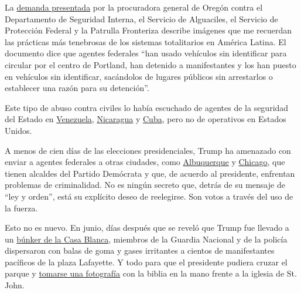 La
\href{http://opb-imgserve-production.s3-website-us-west-2.amazonaws.com/original/ag_rosenblum_xxxx_updated_complaint_1595086491349.pdf}{demanda
presentada} por la procuradora general de Oregón contra el Departamento
de Seguridad Interna, el Servicio de Alguaciles, el Servicio de
Protección Federal y la Patrulla Fronteriza describe imágenes que me
recuerdan las prácticas más tenebrosas de los sistemas totalitarios en
América Latina. El documento dice que agentes federales ``han usado
vehículos sin identificar para circular por el centro de Portland, han
detenido a manifestantes y los han puesto en vehículos sin identificar,
sacándolos de lugares públicos sin arrestarlos o establecer una razón
para su detención''.

Este tipo de abuso contra civiles lo había escuchado de agentes de la
seguridad del Estado en
\href{https://www.nytimes3xbfgragh.onion/es/2020/07/26/espanol/opinion/nicmer-evans-venezuela.html}{Venezuela},
\href{https://www.nytimes3xbfgragh.onion/es/2019/02/18/espanol/opinion/nicaragua-prensa-chamorro.html}{Nicaragua}
y
\href{https://www.nytimes3xbfgragh.onion/es/2019/05/31/espanol/opinion/cuba-jovenes-revolucion.html}{Cuba},
pero no de operativos en Estados Unidos.

A menos de cien días de las elecciones presidenciales, Trump ha
amenazado con enviar a agentes federales a otras ciudades, como
\href{https://www.santafenewmexican.com/news/local_news/trump-announces-deployment-of-federal-agents-to-albuquerque/article_e80a12d6-cc34-11ea-9ab0-5b1cd8827f75.html}{Albuquerque}
y
\href{https://www.nytimes3xbfgragh.onion/2020/07/23/us/politics/trump-chicago-federal-agents.html}{Chicago},
que tienen alcaldes del Partido Demócrata y que, de acuerdo al
presidente, enfrentan problemas de criminalidad. No es ningún secreto
que, detrás de su mensaje de ``ley y orden'', está su explícito deseo de
reelegirse. Son votos a través del uso de la fuerza.

Esto no es nuevo. En junio, días después que se reveló que Trump fue
llevado a un
\href{https://www.nytimes3xbfgragh.onion/2020/05/31/us/politics/trump-protests-george-floyd.html}{búnker
de la Casa Blanca}, miembros de la Guardia Nacional y de la policía
dispersaron con balas de goma y gases irritantes a cientos de
manifestantes pacíficos de la plaza Lafayette. Y todo para que el
presidente pudiera cruzar el parque y
\href{https://www.nytimes3xbfgragh.onion/es/2020/06/03/espanol/mundo/trump-foto-iglesia-protestas.html}{tomarse
una fotografía} con la biblia en la mano frente a la iglesia de St.
John.

